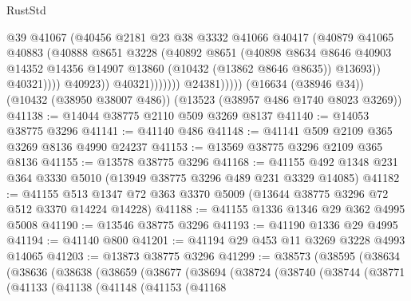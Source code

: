 \begin{lexlean}{RustStd}
\begin{coremodule}
                                  @39
                                  @41067
                                  (@40456
                                    @2181
                                    @23
                                    @38
                                    @3332
                                    @41066
                                    @40417
                                    (@40879
                                      @41065
                                      @40883
                                      (@40888
                                        @8651
                                        @3228
                                        (@40892
                                          @8651
                                          (@40898
                                            @8634
                                            @8646
                                            @40903
                                            @14352
                                            @14356
                                            @14907
                                            @13860
                                            (@10432 (@13862 @8646 @8635))
                                            @13693))
                                        @40321))))
                                @40923))
                            @40321)))))))
              @24381)))))
    (@16634 (@38946 @34))
    (@10432 (@38950 @38007 @486))
    (@13523 (@38957 @486 @1740 @8023 @3269))
@41138 := @14044 @38775 @2110 @509 @3269 @8137
@41140 := @14053 @38775 @3296
@41141 := @41140 @486
@41148 := @41141 @509 @2109 @365 @3269 @8136 @4990 @24237
@41153 := @13569 @38775 @3296 @2109 @365 @8136
@41155 := @13578 @38775 @3296
@41168 := @41155 @492 @1348 @231 @364 @3330 @5010 (@13949 @38775 @3296 @489 @231 @3329 @14085)
@41182 := @41155 @513 @1347 @72 @363 @3370 @5009 (@13644 @38775 @3296 @72 @512 @3370 @14224 @14228)
@41188 := @41155 @1336 @1346 @29 @362 @4995 @5008
@41190 := @13546 @38775 @3296
@41193 := @41190 @1336 @29 @4995
@41194 := @41140 @800
@41201 := @41194 @29 @453 @11 @3269 @3228 @4993 @14065
@41203 := @13873 @38775 @3296
@41299 := @38573
    (@38595
      (@38634
        (@38636
          (@38638
            (@38659
              (@38677
                (@38694
                  (@38724
                    (@38740
                      (@38744
                        (@38771
                          (@41133
                            (@41138
                              (@41148
                                (@41153
                                  (@41168

\end{coremodule}
\end{lexlean}

